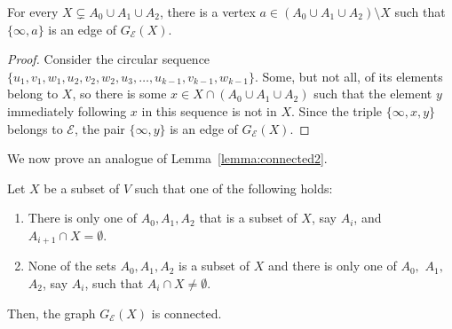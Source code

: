 \documentclass[11pt,a4paper]{article}
\begin{document}
\begin{lemma}
\label{lemma:inftycon}
    For every $X \subsetneq A_0 \cup A_1 \cup A_2$, there is a vertex $a \in (A_0 \cup A_1 \cup A_2) \setminus X$ such that $\{ \infty,  a \}$ is an edge of $G_{\mathcal{E}}(X)$.
\end{lemma}

\begin{proof}
Consider the circular sequence $\{ u_1, v_1, w_1, u_2, v_2, w_2, u_3, \dots, u_{k-1}, v_{k-1}, w_{k-1} \}$. Some, but not all, of its elements belong to $X$, so there is some $x\in X\cap (A_0\cup A_1 \cup A_2)$ such that the element $y$ immediately following $x$ in this sequence is not in $X$. Since the triple $\{\infty, x,y\}$ belongs to $\mathcal{E}$, the pair $\{\infty,y\}$ is an edge of $G_{\mathcal{E}}(X)$.
\end{proof}



We now prove an analogue of Lemma~\ref{lemma:connected2}.

\begin{lemma}
\label{lemma:2,3k+1}
    Let $X$ be a subset of $V$ such that one of the following holds:
        \begin{enumerate}
            \item There is only one of $A_0, A_1, A_2$ that is a subset of $X$, say $A_i$, and $A_{i+1} \cap X = \emptyset$.
            \item None of the sets $A_0, A_1, A_2$ is a subset of $X$ and there is only one of $A_0,$ $A_1,$ $A_2$, say $A_i$, such that $A_i \cap X \neq \emptyset$.
        \end{enumerate}
    Then, the graph $G_{\mathcal{E}} (X)$ is connected.
\end{lemma}
\end{document}
